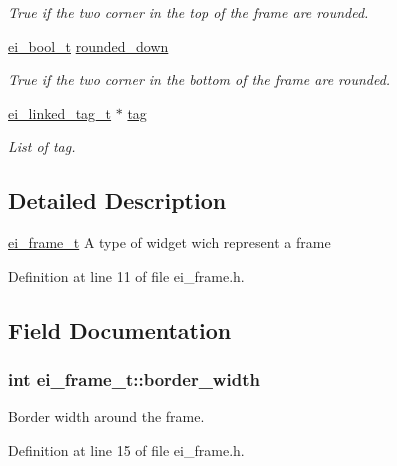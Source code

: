 \begin{DoxyCompactItemize}
\begin{DoxyCompactList}\small\item\em True if the two corner in the top of the frame are rounded. \end{DoxyCompactList}\item 
\hyperlink{ei__types_8h_a383b9af13bd6a0a893096ead3c4d8e28}{ei\+\_\+bool\+\_\+t} \hyperlink{structei__frame__t_a38fd04cba482eb2db2705afd10f2060f}{rounded\+\_\+down}
\begin{DoxyCompactList}\small\item\em True if the two corner in the bottom of the frame are rounded. \end{DoxyCompactList}\item 
\hyperlink{structei__linked__tag__t}{ei\+\_\+linked\+\_\+tag\+\_\+t} $\ast$ \hyperlink{structei__frame__t_adfe60fa92f5065b279f46b716f2ccd73}{tag}
\begin{DoxyCompactList}\small\item\em List of tag. \end{DoxyCompactList}\end{DoxyCompactItemize}


\subsection{Detailed Description}
\hyperlink{structei__frame__t}{ei\+\_\+frame\+\_\+t} A type of widget wich represent a frame 

Definition at line 11 of file ei\+\_\+frame.\+h.



\subsection{Field Documentation}
\hypertarget{structei__frame__t_a3f06d929024f5c8355099f1ea734ddd8}{
\subsubsection[{border\+\_\+width}]{\setlength{\rightskip}{0pt plus 5cm}int ei\+\_\+frame\+\_\+t\+::border\+\_\+width}}\label{structei__frame__t_a3f06d929024f5c8355099f1ea734ddd8}


Border width around the frame. 



Definition at line 15 of file ei\+\_\+frame.\+h.

